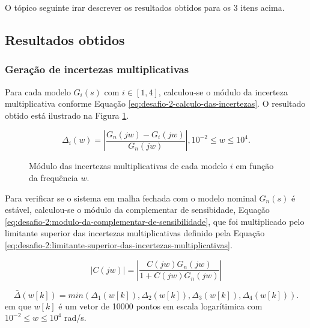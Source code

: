 O tópico seguinte irar descrever os resultados obtidos para os 3 itens acima.

\subsection{Resultados obtidos}
\subsubsection{Geração de incertezas multiplicativas}
\label{subsub:geracao-de-incertezas-multiplicativas}
Para cada modelo $G_{i}(s)$ com $i \in [1,4]$, calculou-se o módulo da incerteza
multiplicativa conforme Equação \ref{eq:desafio-2-calculo-das-incertezas}. O
resultado obtido está ilustrado na Figura
\ref{fig:desafio-2-resultado-questao-1}.

\begin{equation}
    \label{eq:desafio-2-calculo-das-incertezas}
    \Delta_{i}(w) = \left | \frac{G_{n}(jw) - G_{i}(jw)}{G_{n}(jw)} \right |,
    10^{-2} \leq w \leq 10^{4}.
\end{equation}

\begin{figure}[!ht]
    \caption{Módulo das incertezas multiplicativas de cada modelo $i$ em
    função da frequência $w$.}
    \vspace{-10pt}
    \hspace{-30pt}
    \label{fig:desafio-2-resultado-questao-1}
    \begin{minipage}{\linewidth}
        
    \end{minipage}
\end{figure}

Para verificar se o sistema em malha fechada com o modelo nominal $G_{n}(s)$ é
estável, calculou-se o módulo da complementar de sensibidade, Equação
\ref{eq:desafio-2:modulo-da-complementar-de-sensibilidade}, que foi multiplicado
pelo limitante superior das incertezas multiplicativas definido pela Equação
\ref{eq:desafio-2:limitante-superior-das-incertezas-multiplicativas}.

\begin{equation}
    \label{eq:desafio-2:modulo-da-complementar-de-sensibilidade}
    |\textit{C}(jw)| = \left | \frac{C(jw)G_{n}(jw)}{1 + C(jw)G_{n}(jw)} \right |
\end{equation}

\begin{equation}
    \label{eq:desafio-2:limitante-superior-das-incertezas-multiplicativas}
    \bar{\Delta}(w[k]) = min(\Delta_{1}(w[k]), \Delta_{2}(w[k]), \Delta_{3}(w[k]),
    \Delta_{4}(w[k])). 
\end{equation}
em que $w[k]$ é um vetor de 10000 pontos em escala logarítimica com $10^{-2}
\leq w \leq 10^{4}$ rad/s.

